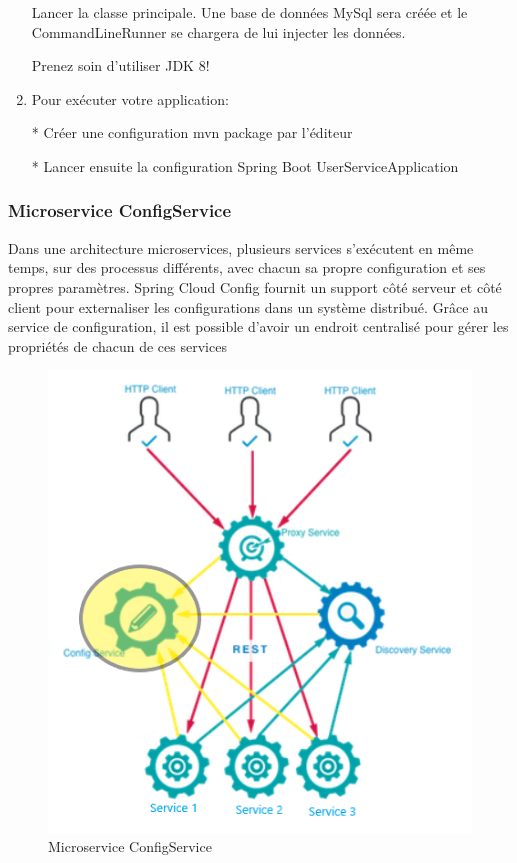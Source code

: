 \begin{enumerate}
Lancer la classe principale. Une base de données MySql sera créée et le CommandLineRunner se chargera de lui injecter les données.


\begin{att}
	Prenez soin d'utiliser JDK 8!
\end{att}


\item Pour exécuter votre application:

  * Créer une configuration mvn package par l'éditeur  
    
        
    
  * Lancer ensuite la configuration Spring Boot UserServiceApplication  
  
    
\end{enumerate}
    
    
     
    
    
        
    \subsubsection{Microservice ConfigService}    
    Dans une architecture microservices, plusieurs services s'exécutent en même temps, sur des processus différents, avec chacun sa propre configuration et ses propres paramètres. Spring Cloud Config fournit un support côté serveur et côté client pour externaliser les configurations dans un système distribué. Grâce au service de configuration, il est possible d'avoir un endroit centralisé pour gérer les propriétés de chacun de ces services
    
    \begin{figure}[H]
    	\centering
    	\includegraphics[width=0.5\linewidth]{images/tp03}
    	\caption{Microservice ConfigService}
    	\label{fig:tp03}
    \end{figure}
    
